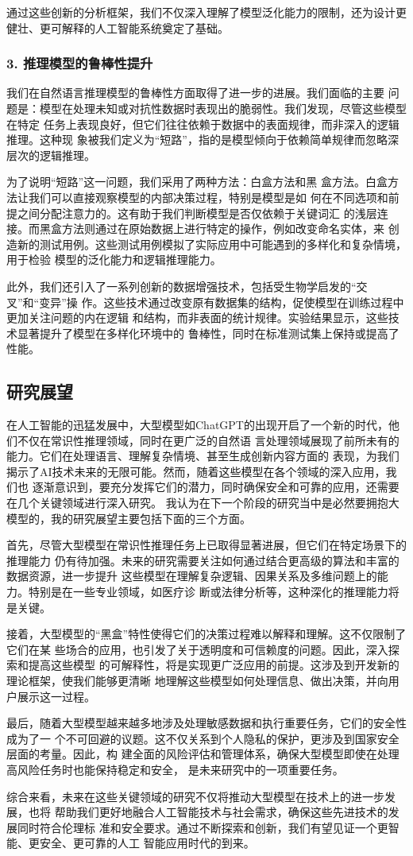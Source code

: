 通过这些创新的分析框架，我们不仅深入理解了模型泛化能力的限制，还为设计更
健壮、更可解释的人工智能系统奠定了基础。

\subsubsection*{3. 推理模型的鲁棒性提升}
我们在自然语言推理模型的鲁棒性方面取得了进一步的进展。我们面临的主要
问题是：模型在处理未知或对抗性数据时表现出的脆弱性。我们发现，尽管这些模型在特定
任务上表现良好，但它们往往依赖于数据中的表面规律，而非深入的逻辑推理。这种现
象被我们定义为``短路''，指的是模型倾向于依赖简单规律而忽略深层次的逻辑推理。

为了说明``短路''这一问题，我们采用了两种方法：白盒方法和黑
盒方法。白盒方法让我们可以直接观察模型的内部决策过程，特别是模型是如
何在不同选项和前提之间分配注意力的。这有助于我们判断模型是否仅依赖于关键词汇
的浅层连接。而黑盒方法则通过在原始数据上进行特定的操作，例如改变命名实体，来
创造新的测试用例。这些测试用例模拟了实际应用中可能遇到的多样化和复杂情境，用于检验
模型的泛化能力和逻辑推理能力。

此外，我们还引入了一系列创新的数据增强技术，包括受生物学启发的``交叉''和``变异''操
作。这些技术通过改变原有数据集的结构，促使模型在训练过程中更加关注问题的内在逻辑
和结构，而非表面的统计规律。实验结果显示，这些技术显著提升了模型在多样化环境中的
鲁棒性，同时在标准测试集上保持或提高了性能。



\subsection{研究展望}
在人工智能的迅猛发展中，大型模型如ChatGPT的出现开启了一个新的时代，他们不仅在常识性推理领域，同时在更广泛的自然语
言处理领域展现了前所未有的能力。它们在处理语言、理解复杂情境、甚至生成创新内容方面的
表现，为我们揭示了AI技术未来的无限可能。然而，随着这些模型在各个领域的深入应用，我们也
逐渐意识到，要充分发挥它们的潜力，同时确保安全和可靠的应用，还需要在几个关键领域进行深入研究。
我认为在下一个阶段的研究当中是必然要拥抱大模型的，我的研究展望主要包括下面的三个方面。

首先，尽管大型模型在常识性推理任务上已取得显著进展，但它们在特定场景下的推理能力
仍有待加强。未来的研究需要关注如何通过结合更高级的算法和丰富的数据资源，进一步提升
这些模型在理解复杂逻辑、因果关系及多维问题上的能力。特别是在一些专业领域，如医疗诊
断或法律分析等，这种深化的推理能力将是关键。

接着，大型模型的``黑盒''特性使得它们的决策过程难以解释和理解。这不仅限制了它们在某
些场合的应用，也引发了关于透明度和可信赖度的问题。因此，深入探索和提高这些模型
的可解释性，将是实现更广泛应用的前提。这涉及到开发新的理论框架，使我们能够更清晰
地理解这些模型如何处理信息、做出决策，并向用户展示这一过程。

最后，随着大型模型越来越多地涉及处理敏感数据和执行重要任务，它们的安全性成为了一
个不可回避的议题。这不仅关系到个人隐私的保护，更涉及到国家安全层面的考量。因此，构
建全面的风险评估和管理体系，确保大型模型即使在处理高风险任务时也能保持稳定和安全，
是未来研究中的一项重要任务。

综合来看，未来在这些关键领域的研究不仅将推动大型模型在技术上的进一步发展，也将
帮助我们更好地融合人工智能技术与社会需求，确保这些先进技术的发展同时符合伦理标
准和安全要求。通过不断探索和创新，我们有望见证一个更智能、更安全、更可靠的人工
智能应用时代的到来。

